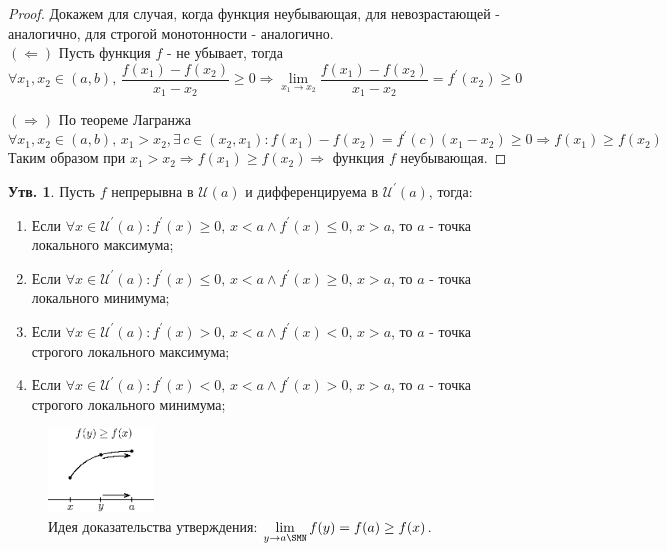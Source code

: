 \documentclass[12pt]{article}
\newcommand{\MU}{\mathcal{U}}
\theoremstyle{definition}
\newtheorem{prop}{Утв.}
\begin{document}
\begin{proof} Докажем для случая, когда функция неубывающая, для невозрастающей - аналогично, для строгой монотонности - аналогично.\\
	$(\Leftarrow)$ Пусть функция $f$ - не убывает, тогда 
	$$\forall x_1, x_2 \in (a,b), \, \dfrac{f(x_1) - f(x_2)}{x_1 - x_2} \geq 0 \Rightarrow \lim\limits_{x_1 \to x_2}\dfrac{f(x_1) - f(x_2)}{x_1 - x_2} = f^\prime(x_2) \geq 0$$
	
	$(\Rightarrow)$ По теореме Лагранжа 
	$$\forall x_1, x_2 \in (a,b), \, x_1 > x_2, \exists \, c \in (x_2, x_1)  \colon f(x_1) - f(x_2) = f^\prime(c)(x_1 - x_2) \geq 0 \Rightarrow f(x_1) \geq f(x_2)$$
	Таким образом при $x_1 > x_2 \Rightarrow f(x_1) \geq f(x_2) \Rightarrow$ функция $f$ неубывающая.
\end{proof}

\begin{prop}
	Пусть $f$ непрерывна в $\MU(a)$ и дифференцируема в $\MU^\prime(a)$, тогда:
	\begin{enumerate}[label={\arabic*)}]
		\item Если $\forall x \in \MU^\prime(a) \colon f^{\prime}(x) \geq 0, \, x < a \wedge f^{\prime}(x) \leq 0, \, x > a$, то $a$ - точка локального максимума;
		\item Если $\forall x \in \MU^\prime(a) \colon f^{\prime}(x) \leq 0, \, x < a \wedge f^{\prime}(x) \geq 0, \, x > a$, то $a$ - точка локального минимума;
		\item Если $\forall x \in \MU^\prime(a) \colon f^{\prime}(x) > 0, \, x < a \wedge f^{\prime}(x) < 0, \, x > a$, то $a$ - точка строгого локального максимума;
		\item Если $\forall x \in \MU^\prime(a) \colon f^{\prime}(x) < 0, \, x < a \wedge f^{\prime}(x) > 0, \, x > a$, то $a$ - точка строгого локального минимума;
	\end{enumerate}
\end{prop}
	
\begin{figure}[H]
	\centering
	\includegraphics[width=0.25\textwidth]{27_2.eps}
	\caption{Идея доказательства утверждения: $\lim\limits_{y \to a\SMN}f(y) =f(a) \geq f(x)$.}
	\label{27_2}
\end{figure}
\end{document}
